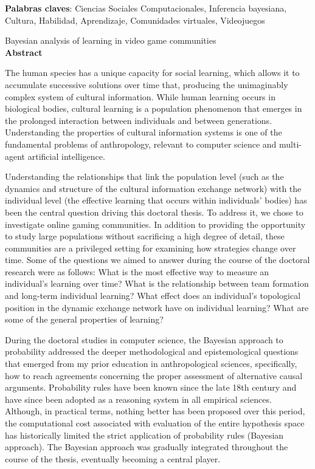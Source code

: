 \documentclass[a4paper,11pt]{book}
\theoremstyle{definition}
\newcommand{\TITULOen}[0]{Bayesian analysis of learning in video game communities}
\begin{document}
\vspace{0.1cm}

\noindent \textbf{Palabras claves}: Ciencias Sociales Computacionales, Inferencia bayesiana, Cultura, Habilidad, Aprendizaje, Comunidades virtuales, Videojuegos


\newpage


\begin{center}
\Large \TITULOen \normalsize \\[0.5cm]

\textbf{Abstract}
\end{center}

The human species has a unique capacity for social learning, which allows it to accumulate successive solutions over time that, producing the unimaginably complex system of cultural information.
%
While human learning occurs in biological bodies, cultural learning is a population phenomenon that emerges in the prolonged interaction between individuals and between generations.
%
Understanding the properties of cultural information systems is one of the fundamental problems of anthropology, relevant to computer science and multi-agent artificial intelligence.


Understanding the relationships that link the population level (such as the dynamics and structure of the cultural information exchange network) with the individual level (the effective learning that occurs within individuals' bodies) has been the central question driving this doctoral thesis.
%
To address it, we chose to investigate online gaming communities. In addition to providing the opportunity to study large populations without sacrificing a high degree of detail, these communities are a privileged setting for examining how strategies change over time.
%
Some of the questions we aimed to answer during the course of the doctoral research were as follows:
%
What is the most effective way to measure an individual's learning over time?
What is the relationship between team formation and long-term individual learning?
What effect does an individual's topological position in the dynamic exchange network have on individual learning?
What are some of the general properties of learning?



During the doctoral studies in computer science, the Bayesian approach to probability addressed the deeper methodological and epistemological questions that emerged from my prior education in anthropological sciences, specifically, how to reach agreements concerning the proper assessment of alternative causal arguments.
%
Probability rules have been known since the late 18th century and have since been adopted as a reasoning system in all empirical sciences.
%
Although, in practical terms, nothing better has been proposed over this period, the computational cost associated with evaluation of the entire hypothesis space has historically limited the strict application of probability rules (Bayesian approach).
%
The Bayesian approach was gradually integrated throughout the course of the thesis, eventually becoming a central player.
\end{document}

